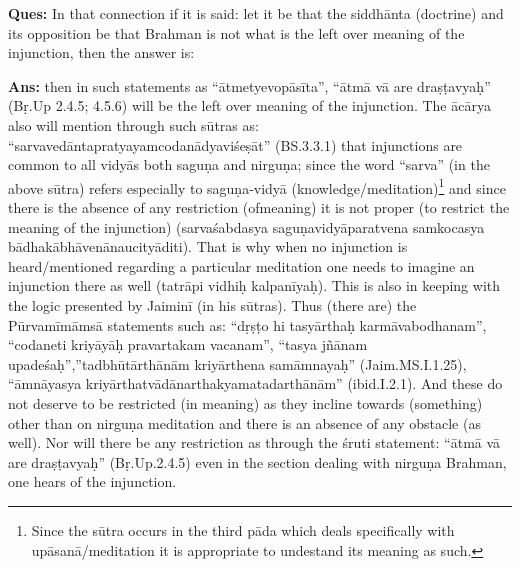 \textbf{Ques:} In that connection if it is said: let it be that the siddhānta (doctrine) and its opposition be that Brahman is not what is the left over meaning of the injunction, then the answer is: 

\textbf{Ans:} then in such statements as “ātmetyevopāsīta”, “ātmā vā are dra\-ṣṭavyaḥ” (Bṛ.Up 2.4.5; 4.5.6) will be the left over meaning of the injunction. The ācārya also will mention through such sūtras as: “sarvavedāntapratyayamcodanādyaviśeṣāt” (BS.3.3.1) that injunctions are common to all vidyās both saguṇa and nirguṇa; since the word “sarva” (in the above sūtra) refers especially to saguṇa-vidyā (knowledge/\-meditation)\footnote{Since the sūtra occurs in the third pāda which deals specifically with upāsanā/\-meditation it is appropriate to undestand its meaning as such.} and since there is the absence of any restriction (of\break meaning) it is not proper (to restrict the meaning of the injunction) (sarvaśabdasya saguṇavidyāparatvena samkocasya bādhakābhāvenānaucityāditi). That is why when no injunction is heard/mentioned regarding a particular meditation one needs to imagine an injunction there as well (tatrāpi vidhiḥ kalpanīyaḥ). This is also in keeping with the logic presented by Jaiminī (in his sūtras). Thus (there are) the  Pūrvamīmāmsā statements such as: “dṛṣṭo hi tasyārthaḥ karmāvabodhanam”, “codaneti kriyāyāḥ pravartakam vacanam”, “tasya jñānam upadeśaḥ”,”tadbhūtārthānām kriyārthena samāmnayaḥ” (Jaim.MS.\break\-I.1.25), “āmnāyasya kriyārthatvādānarthakyamatadarthānām” (ibid.\break\-I.2.1). And these do not deserve to be restricted (in meaning) as they incline towards (something) other than on nirguṇa meditation and there is an absence of any obstacle (as well). Nor will there be any restriction as through the śruti statement: “ātmā vā are draṣṭavyaḥ” (Bṛ.Up.2.4.5) even in the section dealing with nirguṇa Brahman, one hears of the injunction.


